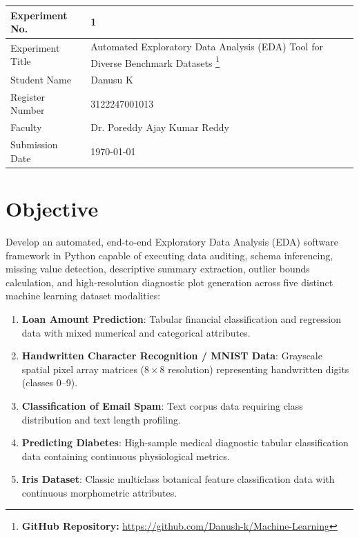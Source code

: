 \documentclass[12pt,a4paper]{article}
\begin{document}
\begin{tabular}{|p{4cm}|p{11cm}|}
\hline
Experiment No. & 1 \\ \hline
Experiment Title & Automated Exploratory Data Analysis (EDA) Tool for Diverse Benchmark Datasets
\footnote{\textbf{GitHub Repository: }\url{https://github.com/Danush-k/Machine-Learning}}\\ \hline
Student Name & Danusu K \\ \hline
Register Number & 3122247001013 \\ \hline
Faculty & Dr. Poreddy Ajay Kumar Reddy \\ \hline
Submission Date & \today \\ \hline
\end{tabular}

\section{Objective}
Develop an automated, end-to-end Exploratory Data Analysis (EDA) software framework in Python capable of executing data auditing, schema inferencing, missing value detection, descriptive summary extraction, outlier bounds calculation, and high-resolution diagnostic plot generation across five distinct machine learning dataset modalities:
\begin{enumerate}[label={(\roman*)}]
\item \textbf{Loan Amount Prediction}: Tabular financial classification and regression data with mixed numerical and categorical attributes.
\item \textbf{Handwritten Character Recognition / MNIST Data}: Grayscale spatial pixel array matrices ($8 \times 8$ resolution) representing handwritten digits (classes 0--9).
\item \textbf{Classification of Email Spam}: Text corpus data requiring class distribution and text length profiling.
\item \textbf{Predicting Diabetes}: High-sample medical diagnostic tabular classification data containing continuous physiological metrics.
\item \textbf{Iris Dataset}: Classic multiclass botanical feature classification data with continuous morphometric attributes.
\end{enumerate}
\end{document}
